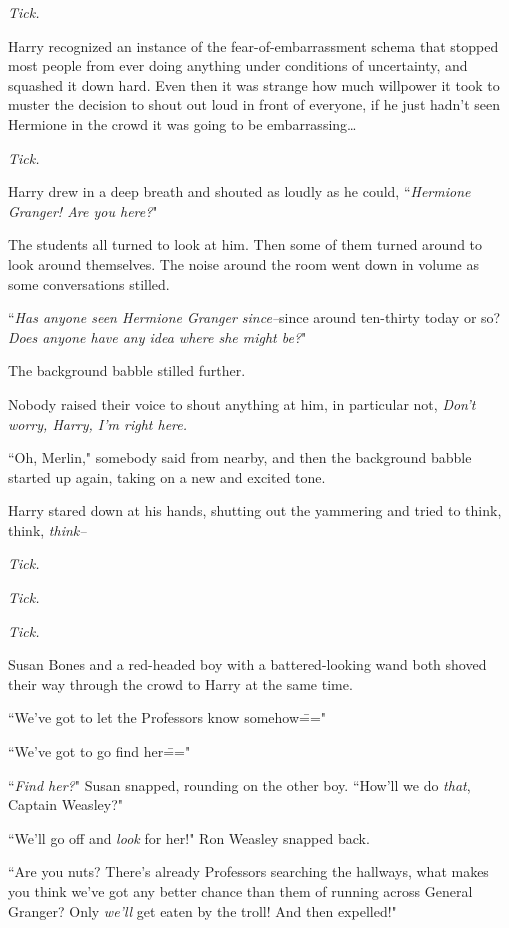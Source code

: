 \emph{Tick.}

Harry recognized an instance of the fear-of-embarrassment schema that stopped most people from ever doing anything under conditions of uncertainty, and squashed it down hard. Even then it was strange how much willpower it took to muster the decision to shout out loud in front of everyone, if he just hadn't seen Hermione in the crowd it was going to be embarrassing{\ldots}

\emph{Tick.}

Harry drew in a deep breath and shouted as loudly as he could, ``\emph{Hermione Granger! Are you here?}"

The students all turned to look at him. Then some of them turned around to look around themselves. The noise around the room went down in volume as some conversations stilled.

``\emph{Has anyone seen Hermione Granger since\---}since around ten-thirty today or so? \emph{Does anyone have any idea where she might be?}"

The background babble stilled further.

Nobody raised their voice to shout anything at him, in particular not, \emph{Don't worry, Harry, I'm right here.}

``Oh, Merlin," somebody said from nearby, and then the background babble started up again, taking on a new and excited tone.

Harry stared down at his hands, shutting out the yammering and tried to think, think, \emph{think\---}

\emph{Tick.}

\emph{Tick.}

\emph{Tick.}

Susan Bones and a red-headed boy with a battered-looking wand both shoved their way through the crowd to Harry at the same time.

``We've got to let the Professors know somehow\==="

``We've got to go find her\==="

``\emph{Find her?}" Susan snapped, rounding on the other boy. ``How'll we do \emph{that}, Captain Weasley?"

``We'll go off and \emph{look} for her!" Ron Weasley snapped back.

``Are you nuts? There's already Professors searching the hallways, what makes you think we've got any better chance than them of running across General Granger? Only \emph{we'll} get eaten by the troll! And then expelled!"

